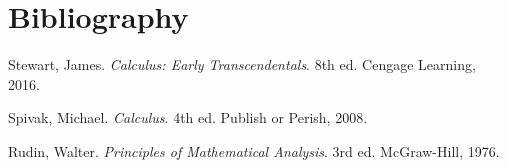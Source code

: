 \documentclass[11pt]{book}
\begin{document}
\chapter*{Bibliography}

\begin{thebibliography}{9}
Stewart, James. \emph{Calculus: Early Transcendentals}. 8th ed. Cengage Learning, 2016.

Spivak, Michael. \emph{Calculus}. 4th ed. Publish or Perish, 2008.

Rudin, Walter. \emph{Principles of Mathematical Analysis}. 3rd ed. McGraw-Hill, 1976.
\end{thebibliography}
\end{document}
